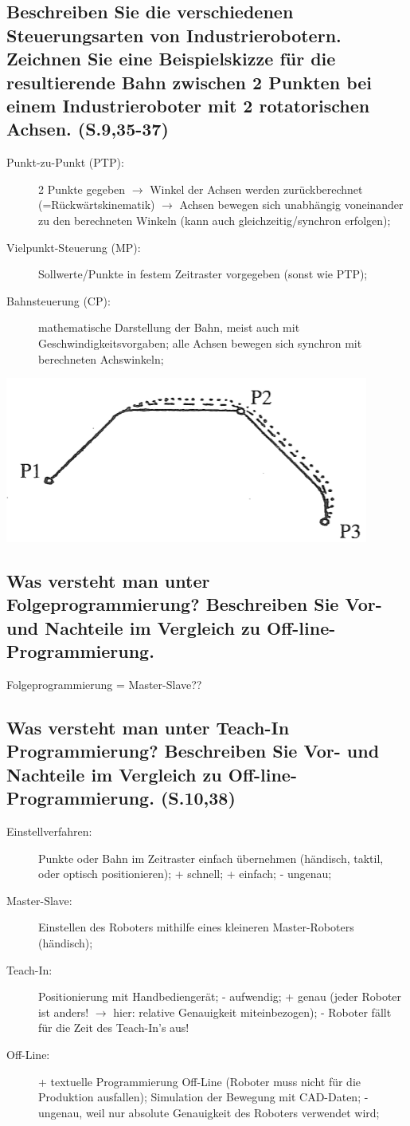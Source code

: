 \subsection{Beschreiben Sie die verschiedenen Steuerungsarten von Industrierobotern. Zeichnen
  Sie eine Beispielskizze für die resultierende Bahn zwischen 2 Punkten bei einem 
  Industrieroboter mit 2 rotatorischen Achsen. (S.9,35-37)}
\begin{description}
\item[Punkt-zu-Punkt (PTP):] 2 Punkte gegeben $\rightarrow$ Winkel der Achsen werden 
  zurückberechnet (=Rückwärtskinematik) $\rightarrow$ Achsen bewegen sich unabhängig 
  voneinander zu den berechneten Winkeln (kann auch gleichzeitig/synchron erfolgen);
\item[Vielpunkt-Steuerung (MP):] Sollwerte/Punkte in festem Zeitraster vorgegeben (sonst
  wie PTP);
\item[Bahnsteuerung (CP):] mathematische Darstellung der Bahn, meist auch mit 
  Geschwindigkeitsvorgaben; alle Achsen bewegen sich synchron mit berechneten Achswinkeln;
\end{description}
\includegraphics[width=.4\textwidth]{pics/ptp_bsp}

\subsection{Was versteht man unter Folgeprogrammierung? Beschreiben Sie Vor- und Nachteile im Vergleich zu Off-line-Programmierung.}

Folgeprogrammierung = Master-Slave??

\subsection{ Was versteht man unter Teach-In Programmierung? Beschreiben Sie Vor- und Nachteile im Vergleich zu Off-line-Programmierung. (S.10,38)}
\begin{description}
\item[Einstellverfahren:] Punkte oder Bahn im Zeitraster einfach übernehmen (händisch, taktil,
  oder optisch positionieren); + schnell; + einfach; - ungenau;
\item[Master-Slave:] Einstellen des Roboters mithilfe eines kleineren Master-Roboters 
  (händisch); 
\item[Teach-In:] Positionierung mit Handbediengerät; 
  - aufwendig; + genau (jeder Roboter ist anders! $\rightarrow$ hier: relative
  Genauigkeit miteinbezogen); - Roboter fällt für die Zeit des Teach-In's aus!
\item[Off-Line:] + textuelle Programmierung Off-Line (Roboter muss nicht für die Produktion 
  ausfallen); Simulation der Bewegung mit CAD-Daten; - ungenau, weil nur absolute Genauigkeit 
  des Roboters verwendet wird;
\end{description}
